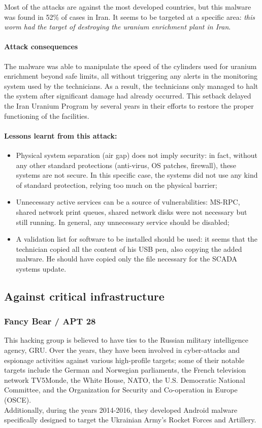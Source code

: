 Most of the attacks are against the most developed countries, but this malware was found in 52\% of cases in Iran. It seems to be targeted at a specific area: \emph{this worm had the target of destroying the uranium enrichment plant in Iran}.

\paragraph{Attack consequences}
The malware was able to manipulate the speed of the cylinders used for uranium enrichment beyond safe limits, all without triggering any alerts in the monitoring system used by the technicians. As a result, the technicians only managed to halt the system after significant damage had already occurred. This setback delayed the Iran Uranium Program by several years in their efforts to restore the proper functioning of the facilities.


\paragraph{Lessons learnt from this attack:}
\begin{itemize}
  \item Physical system separation (air gap) does not imply security: in fact, without any other standard protections (anti-virus, OS patches, firewall), these systems are not secure. In this specific case, the systems did not use any kind of standard protection, relying too much on the physical barrier;
  \item Unnecessary active services can be a source of vulnerabilities: MS-RPC, shared network print queues, shared network disks were not necessary but still running. In general, any unnecessary service should be disabled;
  \item A validation list for software to be installed should be used: it seems that the technician copied all the content of his USB pen, also copying the added malware. He should have copied only the file necessary for the SCADA systems update.
\end{itemize}



\subsection{Against critical infrastructure}

\subsubsection{Fancy Bear / APT 28}
This hacking group is believed to have ties to the Russian military intelligence agency, GRU. Over the years, they have been involved in cyber-attacks and espionage activities against various high-profile targets; some of their notable targets include the German and Norwegian parliaments, the French television network TV5Monde, the White House, NATO, the U.S. Democratic National Committee, and the Organization for Security and Co-operation in Europe (OSCE). \\
Additionally, during the years 2014-2016, they developed Android malware specifically designed to target the Ukrainian Army's Rocket Forces and Artillery.


